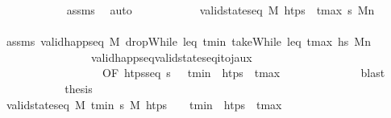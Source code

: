 \begin{isabellebody}
\ \ \ \ \ \ \ \ \ \ \isamarkupfalse%
\ assms\ \isamarkupfalse%
\ auto\isanewline
\ \ \ \ \ \ \ \ \isamarkupfalse%
\ \isamarkupfalse%
\ {\isachardoublequoteopen}valid{\isacharunderscore}{\kern0pt}state{\isacharunderscore}{\kern0pt}seq\ M\ {\isacharparenleft}{\kern0pt}htps{\isacharprime}{\kern0pt}\ {\isacharat}{\kern0pt}\ {\isacharbrackleft}{\kern0pt}t\isactrlsub m\isactrlsub a\isactrlsub x{\isacharbrackright}{\kern0pt}{\isacharparenright}{\kern0pt}\ {\isasympi}s\ M\isactrlsub n{\isachardoublequoteclose}\isanewline
\ \ \ \ \ \ \ \ \ \ \isamarkupfalse%
\ assms\ {\isacartoucheopen}valid{\isacharunderscore}{\kern0pt}happ{\isacharunderscore}{\kern0pt}seq\ M\ {\isacharparenleft}{\kern0pt}dropWhile\ {\isacharparenleft}{\kern0pt}leq\ t\isactrlsub m\isactrlsub i\isactrlsub n{\isacharparenright}{\kern0pt}\ {\isacharparenleft}{\kern0pt}takeWhile\ {\isacharparenleft}{\kern0pt}leq\ t\isactrlsub m\isactrlsub a\isactrlsub x{\isacharparenright}{\kern0pt}\ hs{\isacharparenright}{\kern0pt}{\isacharparenright}{\kern0pt}\ M\isactrlsub n{\isacartoucheclose}\isanewline
\ \ \ \ \ \ \ \ \ \ \ \ \ \ \ \ valid{\isacharunderscore}{\kern0pt}happ{\isacharunderscore}{\kern0pt}seq{\isacharunderscore}{\kern0pt}valid{\isacharunderscore}{\kern0pt}state{\isacharunderscore}{\kern0pt}seq{\isacharunderscore}{\kern0pt}i{\isacharunderscore}{\kern0pt}to{\isacharunderscore}{\kern0pt}j{\isacharunderscore}{\kern0pt}aux\isanewline
\ \ \ \ \ \ \ \ \ \ \ \ \ \ \ \ \ \ {\isacharbrackleft}{\kern0pt}OF\ {\isacartoucheopen}htps{\isacharunderscore}{\kern0pt}seq\ {\isasympi}s\ {\isacharparenleft}{\kern0pt}{\isacharbrackleft}{\kern0pt}{\isacharbrackright}{\kern0pt}\ {\isacharat}{\kern0pt}\ t\isactrlsub m\isactrlsub i\isactrlsub n\ {\isacharhash}{\kern0pt}\ htps{\isacharprime}{\kern0pt}\ {\isacharat}{\kern0pt}\ t\isactrlsub m\isactrlsub a\isactrlsub x\ {\isacharhash}{\kern0pt}\ {\isacharbrackleft}{\kern0pt}{\isacharbrackright}{\kern0pt}{\isacharparenright}{\kern0pt}{\isacartoucheclose}{\isacharbrackright}{\kern0pt}\isanewline
\ \ \ \ \ \ \ \ \ \ \isamarkupfalse%
\ blast\isanewline
\ \ \ \ \ \ \ \ \isamarkupfalse%
\ \isamarkupfalse%
\ {\isacharquery}{\kern0pt}thesis\isanewline
\ \ \ \ \ \ \ \ \ \ \isamarkupfalse%
\ {\isacartoucheopen}valid{\isacharunderscore}{\kern0pt}state{\isacharunderscore}{\kern0pt}seq\ M\ {\isacharbrackleft}{\kern0pt}t\isactrlsub m\isactrlsub i\isactrlsub n{\isacharbrackright}{\kern0pt}\ {\isasympi}s\ M\ {\isacartoucheopen}htps\ {\isacharequal}{\kern0pt}\ {\isacharbrackleft}{\kern0pt}{\isacharbrackright}{\kern0pt}\ {\isacharat}{\kern0pt}\ t\isactrlsub m\isactrlsub i\isactrlsub n\ {\isacharhash}{\kern0pt}\ htps{\isacharprime}{\kern0pt}\ {\isacharat}{\kern0pt}\ t\isactrlsub m\isactrlsub a\isactrlsub x\ {\isacharhash}{\kern0pt}\ {\isacharbrackleft}{\kern0pt}{\isacharbrackright}{\kern0pt}{\isacartoucheclose}\isanewline

\end{isabellebody}
